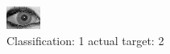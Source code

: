 \begin{figure}[h!]
\begin{center}
\includegraphics[width=0.60\columnwidth]{figures/ID1995_class_1_target_2.png}
\end{center}
\caption{ Classification: 1 actual target: 2}
\label{fig:ID1995_class_1_target_2}
\end{figure}
